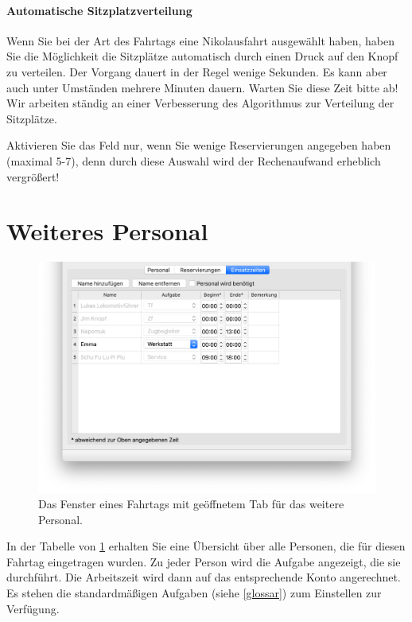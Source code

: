 \paragraph{Automatische Sitzplatzverteilung}
Wenn Sie bei der Art des Fahrtags eine Nikolausfahrt ausgewählt haben, haben Sie die Möglichkeit die Sitzplätze automatisch durch einen Druck auf den Knopf  zu verteilen.
Der Vorgang dauert in der Regel wenige Sekunden.
Es kann aber auch unter Umständen mehrere Minuten dauern.
Warten Sie diese Zeit bitte ab!
Wir arbeiten ständig an einer Verbesserung des Algorithmus zur Verteilung der Sitzplätze.

\begin{hinweis}
  Aktivieren Sie das Feld  nur, wenn Sie wenige Reservierungen angegeben haben (maximal 5-7),
  denn durch diese Auswahl wird der Rechenaufwand erheblich vergrößert!
\end{hinweis}



\section{Weiteres Personal}
\begin{figure}[!h]
	\includegraphics[width=\textwidth]{img/fahrtag_einsatzzeiten}
	\caption{Das Fenster eines Fahrtags mit geöffnetem Tab für das weitere Personal.}
	\label{fig:einsatz:fahrtag:einsatzzeiten}
\end{figure}

In der Tabelle von \cref{fig:einsatz:fahrtag:einsatzzeiten} erhalten Sie eine Übersicht über alle Personen,
die für diesen Fahrtag eingetragen wurden.
Zu jeder Person wird die Aufgabe angezeigt, die sie durchführt.
Die Arbeitszeit wird dann auf das entsprechende Konto angerechnet.
Es stehen die standardmäßigen Aufgaben (siehe \cref{glossar}) zum Einstellen zur Verfügung.

